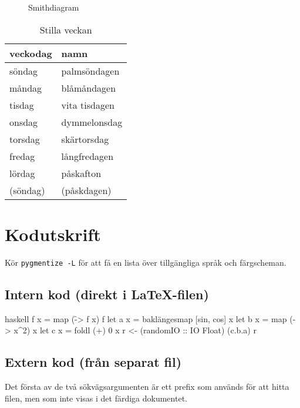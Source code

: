 \documentclass[a4paper, article, oneside]{memoir}
\begin{document}
\begin{figure}[ht]
\centering

\caption{Smithdiagram}
\label{fig:smith}
\end{figure}

\begin{table}[ht]  
\centering
\begin{tabular}{ll}
\toprule
veckodag & namn \\
\midrule
söndag & palmsöndagen \\
måndag & blåmåndagen \\
tisdag & vita tisdagen \\
onsdag & dymmelonsdag \\
torsdag & skärtorsdag \\
fredag & långfredagen \\
lördag & påskafton \\
(söndag) & (påskdagen) \\
\bottomrule
\end{tabular}
\caption{Stilla veckan}
\label{tab:stilla}
\end{table}

\appendix
\chapter{Kodutskrift}

Kör \texttt{pygmentize -L} för att få en lista över tillgängliga språk och färgscheman.

\section{Intern kod (direkt i LaTeX-filen)}

\begin{internallisting}{haskell}
  f x = map (\f -> f x) f
  let a x = baklängesmap [sin, cos] x
  let b x = map (\x -> x^2) x
  let c x = foldl (+) 0 x
  r <- (randomIO :: IO Float)
  (c.b.a) r
\end{internallisting}

\section{Extern kod (från separat fil)}

Det första av de två sökvägsargumenten är ett prefix som används för att hitta filen, men som inte visas i det färdiga dokumentet.

\end{document}
